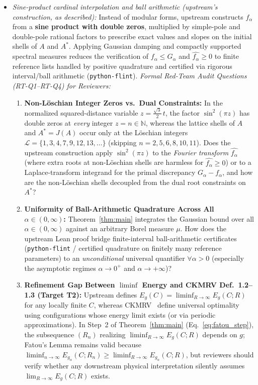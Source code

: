 \documentclass[11pt, a4paper]{article}
\theoremstyle{definition}
\theoremstyle{remark}
\newcommand{\N}{\mathbb{N}}
\begin{document}
\begin{enumerate}[label=\textbf{\arabic*.}]
\begin{itemize}
        \item \textit{Sine-product cardinal interpolation and ball arithmetic (upstream's construction, as described):} Instead of modular forms, upstream constructs $f_\alpha$ from a \textbf{sine product with double zeros}, multiplied by simple-pole and double-pole rational factors to prescribe exact values and slopes on the initial shells of $A$ and $A^*$. Applying Gaussian damping and compactly supported spectral measures reduces the verification of $f_\alpha \le G_\alpha$ and $\widehat{f_\alpha} \ge 0$ to finite reference lists handled by positive quadrature and certified via rigorous interval/ball arithmetic (\texttt{python-flint}). \textit{Formal Red-Team Audit Questions (RT-Q1--RT-Q4) for Reviewers:}
        \begin{enumerate}[label=\textbf{RT-Q\arabic*:}, leftmargin=*]
            \item \textbf{Non-L\"oschian Integer Zeros vs.\ Dual Constraints:} In the normalized squared-distance variable $z = \tfrac{\sqrt{3}}{2}\, t$, the factor $\sin^2(\pi z)$ has double zeros at \emph{every} integer $z = n \in \N$, whereas the lattice shells of $A$ and $A^* = J(A)$ occur only at the L\"oschian integers $\mathcal{L} = \{1, 3, 4, 7, 9, 12, 13, \dots\}$ (skipping $n = 2, 5, 6, 8, 10, 11$). Does the upstream construction apply $\sin^2(\pi z)$ to the \emph{Fourier transform} $\widehat{f_\alpha}$ (where extra roots at non-L\"oschian shells are harmless for $\widehat{f_\alpha} \ge 0$) or to a Laplace-transform integrand for the primal discrepancy $G_\alpha - f_\alpha$, and how are the non-L\"oschian shells decoupled from the dual root constraints on $A^*$?
            \item \textbf{Uniformity of Ball-Arithmetic Quadrature Across All $\alpha \in (0, \infty)$:} Theorem~\ref{thm:main} integrates the Gaussian bound over all $\alpha \in (0, \infty)$ against an arbitrary Borel measure $\mu$. How does the upstream Lean proof bridge finite-interval ball-arithmetic certificates (\texttt{python-flint} / certified quadrature on finitely many reference parameters) to an \emph{unconditional} universal quantifier $\forall \alpha > 0$ (especially the asymptotic regimes $\alpha \to 0^+$ and $\alpha \to +\infty$)?
            \item \textbf{Refinement Gap Between $\liminf$ Energy and CKMRV Def.~1.2--1.3 (Target T2):} Upstream defines $E_g(C) = \liminf_{R\to\infty} E_g(C; R)$ for any locally finite $C$, whereas CKMRV~\cite{CKMRV22} define universal optimality using configurations whose energy limit exists (or via periodic approximations). In Step~2 of Theorem~\ref{thm:main} (Eq.~\eqref{eq:fatou_step}), the subsequence $(R_n)$ realizing $\liminf_{R\to\infty} E_g(C; R)$ depends on $g$; Fatou's Lemma remains valid because $\liminf_{n\to\infty} E_{g_\alpha}(C; R_n) \ge \liminf_{R\to\infty} E_{g_\alpha}(C; R)$, but reviewers should verify whether any downstream physical interpretation silently assumes $\lim_{R\to\infty} E_g(C; R)$ exists.

\end{enumerate}
\end{itemize}
\end{enumerate}
\end{document}
